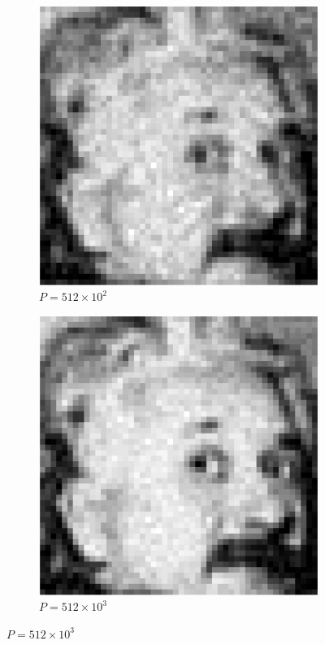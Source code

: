 \documentclass[english,11pt]{article}
\newcommand{\1}{\mathbf{1}}
\numberwithin{equation}{section}
\theoremstyle{plain}
\theoremstyle{definition}
\theoremstyle{remark}
\theoremstyle{plain}
\theoremstyle{remark}
\theoremstyle{plain}
\theoremstyle{plain}
\begin{document}
\begin{figure}[h!]
		\begin{subfigure}[h]{0.45\textwidth}
		\centering
		\includegraphics[scale=0.45]{reconstruction100_cropped}
		\caption{ \small $P = 512\times 10^2$ }
	\end{subfigure}%
	\begin{subfigure}[h]{0.45\textwidth}
		\centering
		\includegraphics[scale=0.45]{reconstruction1000_cropped}
		\caption{\small $P = 512\times 10^3$}
	\end{subfigure}%


\end{figure}
\end{document}
